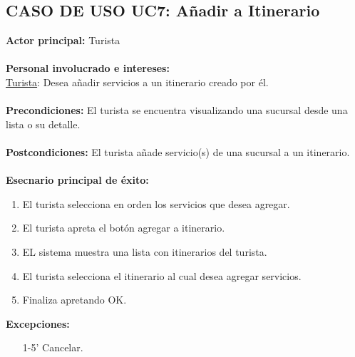 \documentclass[11pt]{article}
\begin{document}
\subsection*{\textbf{CASO DE USO UC7:} Añadir a Itinerario }
\textbf{Actor principal:} Turista\\
\\
\textbf{Personal involucrado e intereses: }\\
\underline{Turista}: Desea añadir servicios a un itinerario creado por él.
\\\\
\textbf{Precondiciones:} El turista se encuentra visualizando una sucursal desde una lista o su detalle.\\
\\
\textbf{Postcondiciones:} El turista añade servicio(s) de una sucursal a un itinerario.\\
\\
\textbf{Esecnario principal de éxito:}
\begin{enumerate}
\item El turista selecciona en orden los servicios que desea agregar.
\item El turista apreta el botón agregar a itinerario.
\item EL sistema muestra una lista con itinerarios del turista.
\item El turista selecciona el itinerario al cual desea agregar servicios.
\item Finaliza apretando OK.
\end{enumerate}
\textbf{Excepciones:}
\begin{enumerate}
\item[1-5'] Cancelar.
\end{enumerate}
\end{document}
